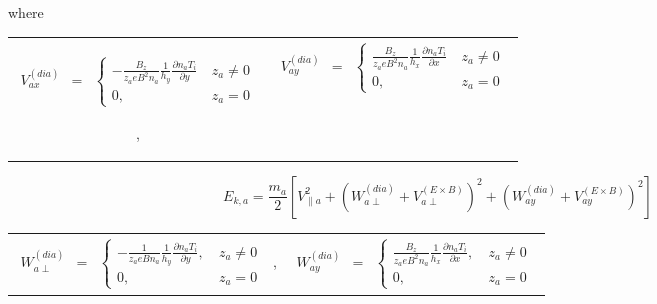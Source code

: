 \documentclass[a4paper,10pt]{report}
\begin{document}
\noindent where
\begin{tabular}{cc}
$\begin{matrix}
V_{ax}^{\left( dia \right)} & =
& \left\{
\begin{matrix}
-\frac{B_z}{z_a e B^2 n_a} \frac{1}{h_y} \frac{\partial n_a T_i}{\partial y} & \ z_a \neq 0 \\
0, & \ z_a = 0
\end{matrix} \right.
\end{matrix}$

,&

$\begin{matrix}
V_{ay}^{\left( dia \right)} & =
& \left\{
\begin{matrix}
\frac{B_z}{z_a e B^2 n_a} \frac{1}{h_x} \frac{\partial n_a T_i}{\partial x} & \ z_a \neq 0 \\
0, & \ z_a = 0
\end{matrix} \right.
\end{matrix}$
\end{tabular}

\begin{equation}
E_{k,a}=\frac{m_a}2 \left[   V^2_{\parallel a}+\left( W_{a\perp}^{\left( dia \right)}+V_{a\perp}^{\left( E \times B \right)}  \right)^2    +   \left(  W_{ay}^{\left( dia \right)} + V_{ay}^{\left( E \times B \right)} \right)^2    \right]
\end{equation}

\begin{tabular}{cc}
$\begin{matrix}
W_{a \perp}^{\left( dia \right)} & =
& \left\{
\begin{matrix}
-\frac{1}{z_a e B n_a} \frac{1}{h_y} \frac{\partial n_a T_i}{\partial y}, & \ z_a \neq 0 \\
0, & \ z_a = 0
\end{matrix} \right.
\end{matrix}$
,&
$\begin{matrix}
W_{ay}^{\left( dia \right)} & =
& \left\{
\begin{matrix}
\frac{B_z}{z_a e B^2 n_a} \frac{1}{h_x} \frac{\partial n_a T_i}{\partial x}, & \ z_a \neq 0 \\
0, & \ z_a = 0
\end{matrix} \right.
\end{matrix}$
\end{tabular}
\end{document}
